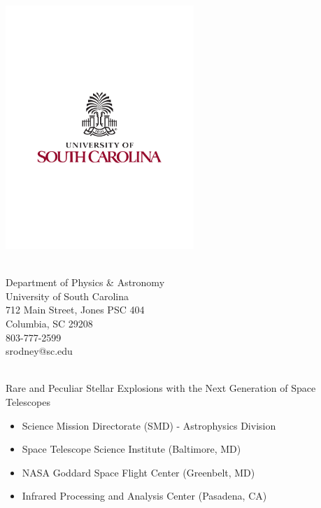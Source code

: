 
\begin{center}
\includegraphics[width=2.8in,draft=False]{USC_Standard_CMYK}%
\end{center}
\bigskip

\bigskip

\\
Department of Physics \& Astronomy\\
University of South Carolina\\
712 Main Street,  Jones PSC 404\\
Columbia, SC  29208\\
803-777-2599  \\  
srodney@sc.edu
\bigskip

\\
Rare and Peculiar Stellar Explosions with the Next Generation of Space Telescopes
\bigskip

\begin{itemize}
\item Science Mission Directorate (SMD) - Astrophysics Division
\end{itemize}
\bigskip

\begin{itemize}
\item Space Telescope Science Institute (Baltimore, MD)
\item NASA Goddard Space Flight Center (Greenbelt, MD)
\item Infrared Processing and Analysis Center (Pasadena, CA)
\end{itemize}

